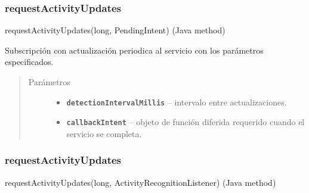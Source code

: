 \subsubsection{requestActivityUpdates}
\label{org/hardroid/api/ActivityRecognitionApi:requestactivityupdates}requestActivityUpdates(long, PendingIntent) (Java method)

\begin{fulllineitems}
\label{org/hardroid/api/ActivityRecognitionApi:org.hardroid.api.ActivityRecognitionApi.requestActivityUpdates(long, PendingIntent)}\par
Subscripción con actualización periodica al servicio con los parámetros especificados.
\begin{quote}\begin{description}
\item[{Parámetros}] \leavevmode\begin{itemize}
\item {} 
\textbf{\texttt{detectionIntervalMillis}} -- intervalo entre actualizaciones.

\item {} 
\textbf{\texttt{callbackIntent}} -- objeto de función diferida requerido cuando el servicio se completa. 
\end{itemize}

\end{description}\end{quote}

\end{fulllineitems}



\subsubsection{requestActivityUpdates}
\label{org/hardroid/api/ActivityRecognitionApi:id2}requestActivityUpdates(long, ActivityRecognitionListener) (Java method)

